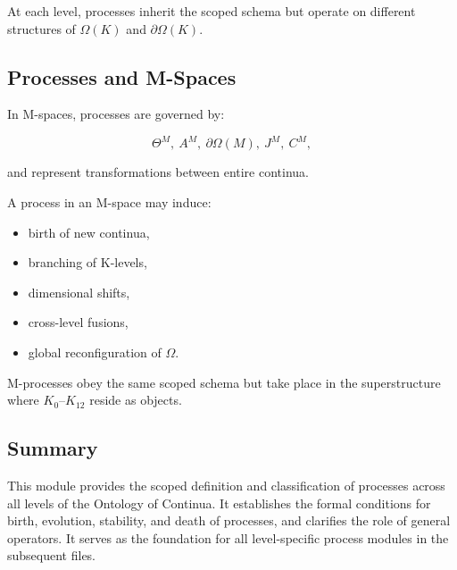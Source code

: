 At each level, processes inherit the scoped schema but operate on
different structures of $\Omega(K)$ and $\partial\Omega(K)$.

\subsection{Processes and M-Spaces}

In M-spaces, processes are governed by:

\[
\Theta^M,\ 
A^M,\ 
\partial\Omega(M),\ 
J^M,\ 
C^M,
\]

and represent transformations between entire continua.  

A process in an M-space may induce:

\begin{itemize}
    \item birth of new continua,
    \item branching of K-levels,
    \item dimensional shifts,
    \item cross-level fusions,
    \item global reconfiguration of $\Omega$.
\end{itemize}

M-processes obey the same scoped schema but take place in the
superstructure where $K_0$--$K_{12}$ reside as objects.

\subsection{Summary}

This module provides the scoped definition and classification of processes
across all levels of the Ontology of Continua.  
It establishes the formal conditions for birth, evolution, stability,
and death of processes, and clarifies the role of general operators.
It serves as the foundation for all level-specific process modules in
the subsequent files.
